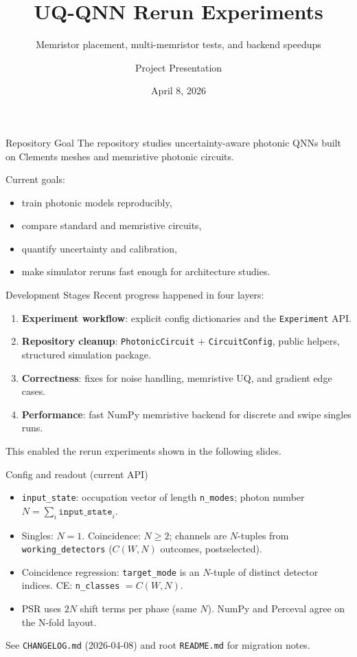 \documentclass{beamer}
\title{UQ-QNN Rerun Experiments}
\subtitle{Memristor placement, multi-memristor tests, and backend speedups}
\author{Project Presentation}
\date{April 8, 2026}
\begin{document}
\begin{frame}
    \titlepage
\end{frame}

\begin{frame}{Repository Goal}
The repository studies uncertainty-aware photonic QNNs built on Clements meshes and memristive photonic circuits.

\vspace{0.5em}
Current goals:
\begin{itemize}
    \item train photonic models reproducibly,
    \item compare standard and memristive circuits,
    \item quantify uncertainty and calibration,
    \item make simulator reruns fast enough for architecture studies.
\end{itemize}
\end{frame}

\begin{frame}{Development Stages}
Recent progress happened in four layers:
\begin{enumerate}
    \item \textbf{Experiment workflow}: explicit config dictionaries and the \texttt{Experiment} API.
    \item \textbf{Repository cleanup}: \texttt{PhotonicCircuit} + \texttt{CircuitConfig}, public helpers, structured simulation package.
    \item \textbf{Correctness}: fixes for noise handling, memristive UQ, and gradient edge cases.
    \item \textbf{Performance}: fast NumPy memristive backend for discrete and swipe singles runs.
\end{enumerate}

\vspace{0.5em}
This enabled the rerun experiments shown in the following slides.
\end{frame}

\begin{frame}{Config and readout (current API)}
\begin{itemize}
    \item \texttt{input\_state}: occupation vector of length \texttt{n\_modes}; photon number \(N = \sum_i \texttt{input\_state}_i\).
    \item Singles: \(N=1\). Coincidence: \(N \geq 2\); channels are \(N\)-tuples from \texttt{working\_detectors} (\(C(W,N)\) outcomes, postselected).
    \item Coincidence regression: \texttt{target\_mode} is an \(N\)-tuple of distinct detector indices. CE: \texttt{n\_classes} \(= C(W,N)\).
    \item PSR uses \(2N\) shift terms per phase (same \(N\)). NumPy and Perceval agree on the N-fold layout.
\end{itemize}
\vspace{0.3em}
\small See \texttt{CHANGELOG.md} (2026-04-08) and root \texttt{README.md} for migration notes.
\end{frame}
\end{document}
